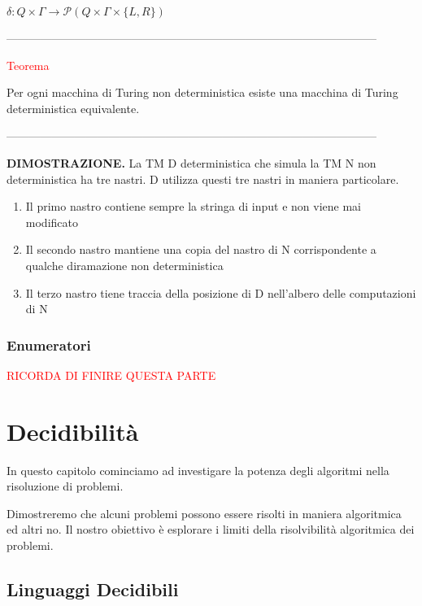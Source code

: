 \documentclass{article}
\begin{document}
\begin{center}
    $\delta: Q \times \Gamma \rightarrow \mathcal{P}(Q \times \Gamma \times \{L,
    R\})$
\end{center}

--------------------------------------------------------------------------------------------------

\begin{center}
    \textcolor{red}{Teorema}
\end{center}

Per ogni macchina di Turing non deterministica esiste una macchina di Turing
deterministica equivalente.

--------------------------------------------------------------------------------------------------

\textbf{DIMOSTRAZIONE.}  La TM D deterministica che simula la TM N non
deterministica ha tre nastri. D utilizza questi tre nastri in maniera
particolare.

\begin{enumerate}
    \item Il primo nastro contiene sempre la stringa di input e non viene mai
    modificato
    \item Il secondo nastro mantiene una copia del nastro di N corrispondente a
    qualche diramazione non deterministica
    \item Il terzo nastro tiene traccia della posizione di D nell'albero delle
    computazioni di N
\end{enumerate}

\subsubsection{Enumeratori}

\textcolor{red}{RICORDA DI FINIRE QUESTA PARTE}

\section{Decidibilità}

In questo capitolo cominciamo ad investigare la potenza degli algoritmi nella
risoluzione di problemi.

Dimostreremo che alcuni problemi possono essere risolti in maniera algoritmica
ed altri no. Il nostro obiettivo è esplorare i limiti della risolvibilità
algoritmica dei problemi. 

\subsection{Linguaggi Decidibili}
\end{document}
